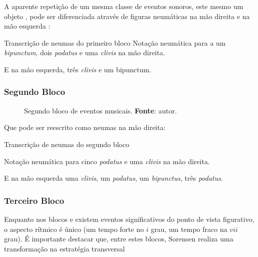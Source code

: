 A aparente repetição de um mesma classe de eventos sonoros, este mesmo um objeto , pode ser diferenciada através de figuras neumáticas na mão direita e na mão esquerda :

\begin{example}{Transcrição de neumas do primeiro bloco}\label{fig:neumaMD1}
  Notação neumática para a um \emph{bipunctum}, dois \emph{podatus} e uma \emph{clivis} na mão direita.

  \centering{}

  E na mão esquerda, três \emph{clivis} e um bipunctum.

  \centering{}

\end{example}

\subsubsection*{Segundo Bloco}

\begin{figure}[!h]
  \centering
  
  \caption{Segundo bloco de eventos musicais. \textbf{Fonte}: autor.}
  \label{fig:ask3}
\end{figure}

Que pode ser reescrito como neumas na mão direita:

\begin{example}{Transcrição de neumas do segundo bloco}\label{fig:neumaMD2}

  Notação neumática para cinco \emph{podatus} e uma \emph{clivis} na mão direita.

  \centering{}

  E na mão esquerda uma \emph{clivis}, um \emph{podatus}, um \emph{bipunctus}, três \emph{podatus}.

  \centering{}
\end{example}

\subsubsection*{Terceiro Bloco}

Enquanto nos blocos  e  existem eventos significativos do ponto de vista figurativo, o aspecto rítmico é único (um tempo forte no $i$ grau, um tempo fraco na $vii$ grau). É importante destacar que, entre estes blocos, Sorensen realiza uma transformação na estratégia transversal

